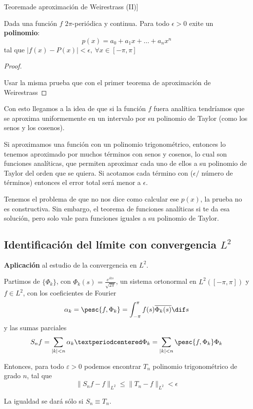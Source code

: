 		\begin{theorem}Teorema\IS de aproximación de Weirestrass (II)] \label{thm:AproxWeierstrass2}
		$ $ %

		\noindent Dada una función $f$ $2\pi$-periódica y continua. Para todo $\epsilon > 0$ exite un {\bf polinomio}:
		$$p(x)= a_0 + a_1 x + … + a_n x^n$$ tal que $|f(x)-P(x)| < \epsilon, \ \forall x \in [-\pi,\pi]$
		\end{theorem}

		\begin{proof}
		$ $ %

		\noindent Usar la misma prueba que con el primer teorema de aproximación de Weirestrass
		\end{proof}

		Con esto llegamos a la idea de que si la función $f$ fuera analítica tendríamos que se aproxima uniformemente en un intervalo por su polinomio de Taylor (como los senos y los cosenos).

		Si aproximamos una función con un polinomio trigonométrico, entonces lo tenemos aproximado por muchos términos con senos y cosenos, lo cual son funciones analíticas, que permiten aproximar cada uno de ellos a su polinomio de Taylor del orden que se quiera. Si acotamos cada término con ($\epsilon / $ número de términos) entonces el error total será menor a $\epsilon$.

		Tenemos el problema de que no nos dice como calcular ese $p(x)$, la prueba no es constructiva. Sin embargo, el teorema de funciones analíticas si te da esa solución, pero solo vale para funciones iguales a su polinomio de Taylor.

		\subsection{Identificación del límite con convergencia $L^2$}
		\textbf{Aplicación} al estudio de la convergencia en $L^2$.

		\begin{theorem} \label{thm:ConvergenciaL2}
			Partimos de $\{\Phi_k\}$, con $\Phi_k(s) = \frac{e^{iks}}{\sqrt{2\pi}}$, un sistema ortonormal en $L^2([-\pi,\pi])$ y $f \in L^2$, con los coeficientes de Fourier
			\[\alpha_k = \pesc{f, \Phi_{k}} = \int_{-\pi}^\pi f(s) \overline{\Phi_k(s)} \dif s  \] y las sumas parciales
			\[  S_n f = \sum_{|k| < n} \alpha_k · \Phi_k = \sum_{|k| < n}\pesc{f, \Phi_k} \Phi_k \]

			Entonces, para todo $ε > 0$ podemos encontrar $T_n$ polinomio trigonométrico de grado $n$, tal que
			\[ \| S_n f - f\|_{L^2} \leq \| T_n - f \|_{L^2} < \epsilon \]

			La igualdad se dará sólo si $S_n \equiv T_n$.

		\end{theorem}

